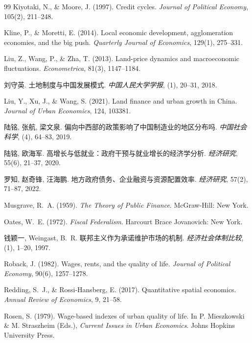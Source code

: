 \documentclass[UTF8,a4paper,12pt]{ctexart}
\theoremstyle{plain}
\theoremstyle{definition}
\theoremstyle{remark}
\begin{document}
\begin{thebibliography}{99}
Kiyotaki, N., \& Moore, J. (1997).
Credit cycles.
\textit{Journal of Political Economy}, 105(2), 211--248.

Kline, P., \& Moretti, E. (2014).
Local economic development, agglomeration economies, and the big push.
\textit{Quarterly Journal of Economics}, 129(1), 275--331.

Liu, Z., Wang, P., \& Zha, T. (2013).
Land-price dynamics and macroeconomic fluctuations.
\textit{Econometrica}, 81(3), 1147--1184.

刘守英.
土地制度与中国发展模式.
\textit{中国人民大学学报}, (1), 20--31, 2018.

Liu, Y., Xu, J., \& Wang, S. (2021).
Land finance and urban growth in China.
\textit{Journal of Urban Economics}, 124, 103381.

陆铭, 张航, 梁文泉.
偏向中西部的政策影响了中国制造业的地区分布吗.
\textit{中国社会科学}, (4), 64--83, 2019.

陆铭, 欧海军.
高增长与低就业：政府干预与就业增长的经济学分析.
\textit{经济研究}, 55(6), 21--37, 2020.

罗知, 赵奇锋, 汪海鹏.
地方政府债务、企业融资与资源配置效率.
\textit{经济研究}, 57(2), 71--87, 2022.

Musgrave, R.~A. (1959).
\textit{The Theory of Public Finance}.
McGraw-Hill: New York.

Oates, W.~E. (1972).
\textit{Fiscal Federalism}.
Harcourt Brace Jovanovich: New York.

钱颖一, Weingast, B.~R.
联邦主义作为承诺维护市场的机制.
\textit{经济社会体制比较}, (1), 1--20, 1997.

Roback, J. (1982).
Wages, rents, and the quality of life.
\textit{Journal of Political Economy}, 90(6), 1257--1278.

Redding, S.~J., \& Rossi-Hansberg, E. (2017).
Quantitative spatial economics.
\textit{Annual Review of Economics}, 9, 21--58.

Rosen, S. (1979).
Wage-based indexes of urban quality of life.
In P. Mieszkowski \& M. Straszheim (Eds.),
\textit{Current Issues in Urban Economics}.
Johns Hopkins University Press.


\end{thebibliography}
\end{document}
